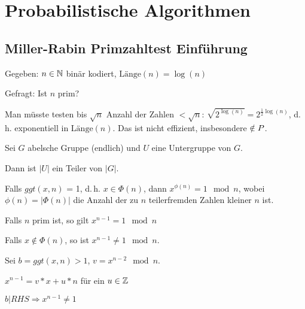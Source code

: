 





\chapter{Probabilistische Algorithmen} %
\label{cha:probabilistische_algorithmen}



\section{Miller-Rabin Primzahltest Einführung}

Gegeben: $n \in \mathbb{N}$ binär kodiert, $\text{Länge}(n) = \log(n)$

Gefragt: Ist $n$ prim?

Man müsste testen bis $\sqrt{n}$
Anzahl der Zahlen $< \sqrt{n}$: $\sqrt{2^{\log(n)}} = 2^{\frac{1}{2} \log(n)}$, d.\,h. exponentiell in $\text{Länge}(n)$.
Das ist nicht effizient, insbesondere $\notin P$.


\begin{lemma}

    Sei $G$ abelsche Gruppe (endlich) und $U$ eine Untergruppe von $G$.

    Dann ist $|U|$ ein Teiler von $|G|$.

\end{lemma}

\begin{korollar}

    Falls $ggt(x, n)$ = 1, d.\,h. $x \in \Phi(n)$, dann $x^{\phi(n)} = 1 \mod n$,
    wobei $\phi(n) = |\Phi(n)|$ die Anzahl der zu $n$ teilerfremden Zahlen kleiner $n$ ist.

\end{korollar}

\begin{korollar}

    Falls $n$ prim ist, so gilt $x^{n-1} = 1 \mod n$

\end{korollar}


\begin{lemma}

    Falls $x \notin \Phi(n)$, so ist $x^{n-1} \neq 1 \mod n$.

\end{lemma}
\begin{beweis}

    Sei $b = ggt(x, n) > 1$, $v = x^{n-2} \mod n$.

    $x^{n-1} = v * x + u * n $ für ein $u \in \mathbb{Z}$

    $b | RHS \Rightarrow x^{n-1} \neq 1$

\end{beweis}



